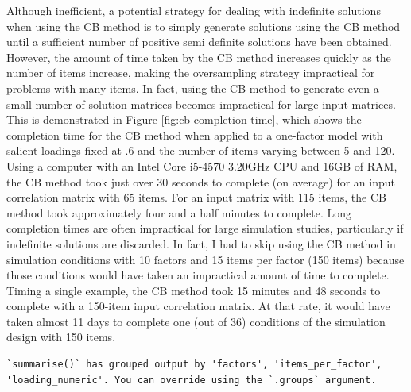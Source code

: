 \documentclass[11pt]{umnthesis}
\begin{document}
Although inefficient, a potential strategy for dealing with indefinite solutions when using the CB method is to simply generate solutions using the CB method until a sufficient number of positive semi definite solutions have been obtained. However, the amount of time taken by the CB method increases quickly as the number of items increase, making the oversampling strategy impractical for problems with many items. In fact, using the CB method to generate even a small number of solution matrices becomes impractical for large input matrices. This is demonstrated in Figure \ref{fig:cb-completion-time}, which shows the completion time for the CB method when applied to a one-factor model with salient loadings fixed at .6 and the number of items varying between 5 and 120. Using a computer with an Intel Core i5-4570 3.20GHz CPU and 16GB of RAM, the CB method took just over 30 seconds to complete (on average) for an input correlation matrix with 65 items. For an input matrix with 115 items, the CB method took approximately four and a half minutes to complete. Long completion times are often impractical for large simulation studies, particularly if indefinite solutions are discarded. In fact, I had to skip using the CB method in simulation conditions with 10 factors and 15 items per factor (150 items) because those conditions would have taken an impractical amount of time to complete. Timing a single example, the CB method took 15 minutes and 48 seconds to complete with a 150-item input correlation matrix. At that rate, it would have taken almost 11 days to complete one (out of 36) conditions of the simulation design with 150 items.



\begin{verbatim}
`summarise()` has grouped output by 'factors', 'items_per_factor',
'loading_numeric'. You can override using the `.groups` argument.
\end{verbatim}
\end{document}
